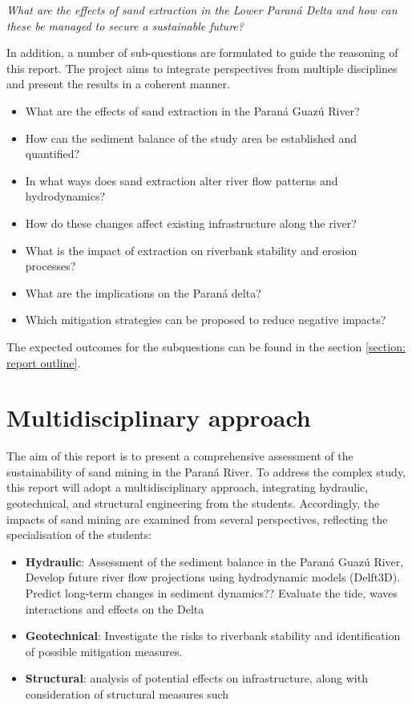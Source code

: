 \textit{What are the effects of sand extraction in the Lower Paraná
Delta and how can these be managed to secure a sustainable future?}

In addition, a number of sub-questions are formulated to guide the reasoning of this report. The project aims to integrate perspectives from multiple disciplines and present the results in a coherent manner.

\begin{itemize} 
    \item What are the effects of sand extraction in the Paraná Guazú River?
    \item How can the sediment balance of the study area be established and quantified?
    \item In what ways does sand extraction alter river flow patterns and hydrodynamics?
    \item How do these changes affect existing infrastructure along the river?
    \item What is the impact of extraction on riverbank stability and erosion processes?
    \item What are the implications on the Paraná delta?
    \item Which mitigation strategies can be proposed to reduce negative impacts?
\end{itemize}

The expected outcomes for the subquestions can be found in the section \ref{section: report outline}.

\section{Multidisciplinary approach}
The aim of this report is to present a comprehensive assessment of the sustainability of sand mining in the Paraná River.
To address the complex study, this report will adopt a multidisciplinary approach, integrating hydraulic, geotechnical, and structural engineering from the students.
Accordingly, the impacts of sand mining are examined from several perspectives, reflecting the specialisation of the students:

\begin{itemize}
    \item \textbf{Hydraulic}: 
    Assessment of the sediment balance in the Paraná Guazú River,
    Develop future river flow projections using hydrodynamic models (Delft3D). Predict long-term changes in sediment dynamics??
    Evaluate the tide, waves interactions and effects on the Delta
    \item \textbf{Geotechnical}: 
    Investigate the risks to riverbank stability and identification of possible mitigation measures.
    \item \textbf{Structural}: analysis of potential effects on infrastructure, along with consideration of structural measures such 
\end{itemize}


